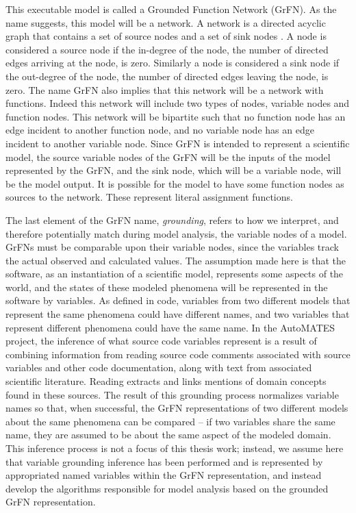 This executable model is called a Grounded Function Network (GrFN).
As the name suggests, this model will be a network.
A network is a directed acyclic graph that contains a set of source nodes and a set of sink nodes \citep{bondy1976graph}.
A node is considered a source node if the in-degree of the node, the number of directed edges arriving at the node, is zero.
Similarly a node is considered a sink node if the out-degree of the node, the number of directed edges leaving the node, is zero.
The name GrFN also implies that this network will be a network with functions.
Indeed this network will include two types of nodes, variable nodes and function nodes.
This network will be bipartite such that no function node has an edge incident to another function node, and no variable node has an edge incident to another variable node.
Since GrFN is intended to represent a scientific model, the source variable nodes of the GrFN will be the inputs of the model represented by the GrFN, and the sink node, which will be a variable node, will be the model output.
It is possible for the model to have some function nodes as sources to the network.
These represent literal assignment functions.

The last element of the GrFN name, \emph{grounding}, refers to how we interpret, and therefore potentially match during model analysis, the variable nodes of a model.
GrFNs must be comparable upon their variable nodes, since the variables track the actual observed and calculated values.
The assumption made here is that the software, as an instantiation of a scientific model, represents some aspects of the world, and the states of these modeled phenomena will be represented in the software by variables.
As defined in code, variables from two different models that represent the same phenomena could have different names, and two variables that represent different phenomena could have the same name.
In the AutoMATES project, the inference of what source code variables represent is a result of combining information from reading source code comments associated with source variables and other code documentation, along with text from associated scientific literature. Reading extracts and links mentions of domain concepts found in these sources. The result of this grounding process normalizes variable names so that, when successful, the GrFN representations of two different models about the same phenomena can be compared -- if two variables share the same name, they are assumed to be about the same aspect of the modeled domain. This inference process is not a focus of this thesis work; instead, we assume here that variable grounding inference has been performed and is represented by appropriated named variables within the GrFN representation, and instead develop the algorithms responsible for model analysis based on the grounded GrFN representation.

